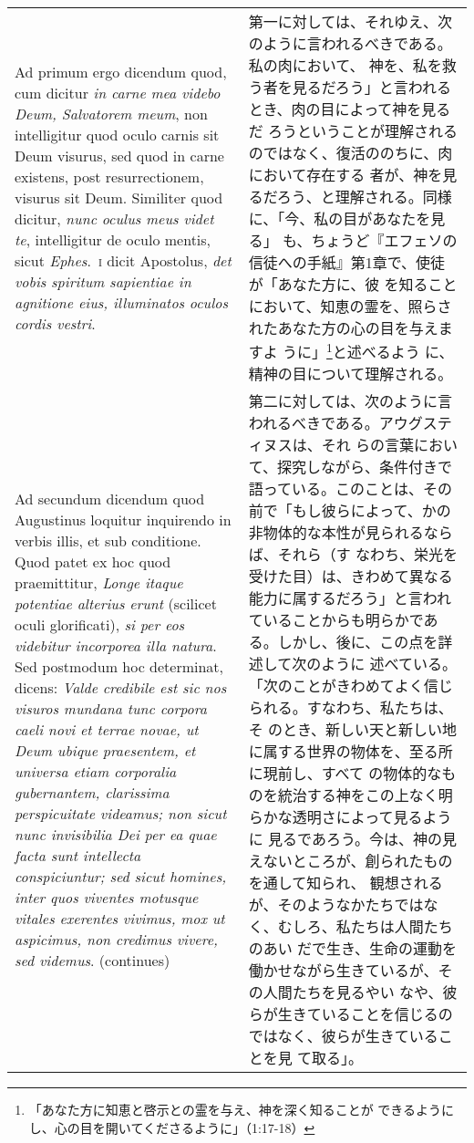 \documentclass[10pt]{jsarticle} %
\begin{document}
\begin{longtable}{p{21em}p{21em}}
\\

{\sc Ad primum ergo dicendum} quod, cum dicitur {\it in carne mea
videbo Deum, Salvatorem meum}, non intelligitur quod oculo carnis sit
Deum visurus, sed quod in carne existens, post resurrectionem, visurus
sit Deum. Similiter quod dicitur, {\it nunc oculus meus videt te},
intelligitur de oculo mentis, sicut {\it Ephes}.\ {\scshape i} dicit
Apostolus, {\it det vobis spiritum sapientiae in agnitione eius,
illuminatos oculos cordis vestri}.

&

第一に対しては、それゆえ、次のように言われるべきである。私の肉において、
神を、私を救う者を見るだろう」と言われるとき、肉の目によって神を見るだ
ろうということが理解されるのではなく、復活ののちに、肉において存在する
者が、神を見るだろう、と理解される。同様に、「今、私の目があなたを見る」
も、ちょうど『エフェソの信徒への手紙』第1章で、使徒が「あなた方に、彼
を知ることにおいて、知恵の霊を、照らされたあなた方の心の目を与えますよ
うに」\footnote{「あなた方に知恵と啓示との霊を与え、神を深く知ることが
できるようにし、心の目を開いてくださるように」（1:17-18）}と述べるよう
に、精神の目について理解される。

\\

{\sc Ad secundum dicendum} quod Augustinus loquitur inquirendo in
verbis illis, et sub conditione. Quod patet ex hoc quod praemittitur,
{\it Longe itaque potentiae alterius erunt} (scilicet oculi
glorificati), {\it si per eos videbitur incorporea illa natura}. Sed
postmodum hoc determinat, dicens: {\it Valde credibile est sic nos
visuros mundana tunc corpora caeli novi et terrae novae, ut Deum
ubique praesentem, et universa etiam corporalia gubernantem,
clarissima perspicuitate videamus; non sicut nunc invisibilia Dei per
ea quae facta sunt intellecta conspiciuntur; sed sicut homines, inter
quos viventes motusque vitales exerentes vivimus, mox ut aspicimus,
non credimus vivere, sed videmus}. (continues)

&

第二に対しては、次のように言われるべきである。アウグスティヌスは、それ
らの言葉において、探究しながら、条件付きで語っている。このことは、その
前で「もし彼らによって、かの非物体的な本性が見られるならば、それら（す
なわち、栄光を受けた目）は、きわめて異なる能力に属するだろう」と言われ
ていることからも明らかである。しかし、後に、この点を詳述して次のように
述べている。「次のことがきわめてよく信じられる。すなわち、私たちは、そ
のとき、新しい天と新しい地に属する世界の物体を、至る所に現前し、すべて
の物体的なものを統治する神をこの上なく明らかな透明さによって見るように
見るであろう。今は、神の見えないところが、創られたものを通して知られ、
観想されるが、そのようなかたちではなく、むしろ、私たちは人間たちのあい
だで生き、生命の運動を働かせながら生きているが、その人間たちを見るやい
なや、彼らが生きていることを信じるのではなく、彼らが生きていることを見
て取る」。


\end{longtable}
\end{document}

